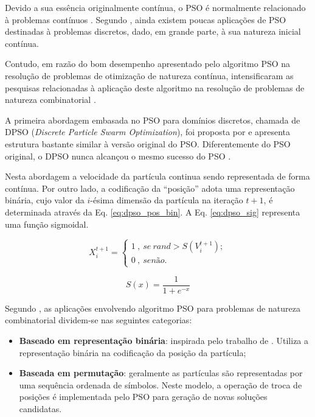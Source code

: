 \documentclass[
	12pt,				%
	openany,			%
	oneside,	
	a4paper,			%
	brazil,				%
	]{unimontes-ppgmsc-abntex2}
\begin{document}
Devido a sua essência originalmente contínua, o PSO é normalmente relacionado à problemas contínuos \cite{Kennedy_1997}. Segundo , ainda existem poucas aplicações de PSO destinadas à problemas discretos, dado, em grande parte, à sua natureza inicial contínua. 

Contudo, em razão do bom desempenho apresentado pelo algoritmo PSO na resolução de problemas de otimização de natureza contínua, intensificaram as pesquisas relacionadas à aplicação deste algoritmo na resolução de problemas de natureza combinatorial \cite{Wang2_2011}. 

A primeira abordagem embasada no PSO para domínios discretos, chamada de DPSO (\textit{Discrete Particle Swarm Optimization}), foi proposta por  e apresenta estrutura bastante similar à versão original do PSO. Diferentemente do PSO original, o DPSO nunca alcançou o mesmo sucesso do PSO \cite{Hoffmann_2011}. 

Nesta abordagem a velocidade da partícula continua sendo representada de forma contínua. Por outro lado, a codificação da ``posição'' adota uma representação binária, cujo valor da $i$-ésima dimensão da partícula na iteração $t+1$, é determinada através da Eq. \ref{eq:dpso_pos_bin}. A Eq. \ref{eq:dpso_sig} representa uma função sigmoidal.

\begin{equation}
\label{eq:dpso_pos_bin}
X^{t+1}_{i} = \left\{\begin{array}{l}
1\ ,\ se\ rand > S(V^{t+1}_{i}); \\
0\ ,\ senão.
\end{array}\right.
\end{equation}

\begin{equation}
\label{eq:dpso_sig}
S(x) = \frac{1}{1 + e^{-x}}
\end{equation}

Segundo , as aplicações envolvendo algoritmo PSO para problemas de natureza combinatorial dividem-se nas seguintes categorias: 

\begin{itemize}
\item \textbf{Baseado em representação binária}: inspirada pelo trabalho de . Utiliza a representação binária na codificação da posição da partícula;
\item \textbf{Baseada em permutação}: geralmente as partículas são representadas por uma sequência ordenada de símbolos. Neste modelo, a operação de troca de posições é implementada pelo PSO para geração de novas soluções candidatas.
\end{itemize}
\end{document}
